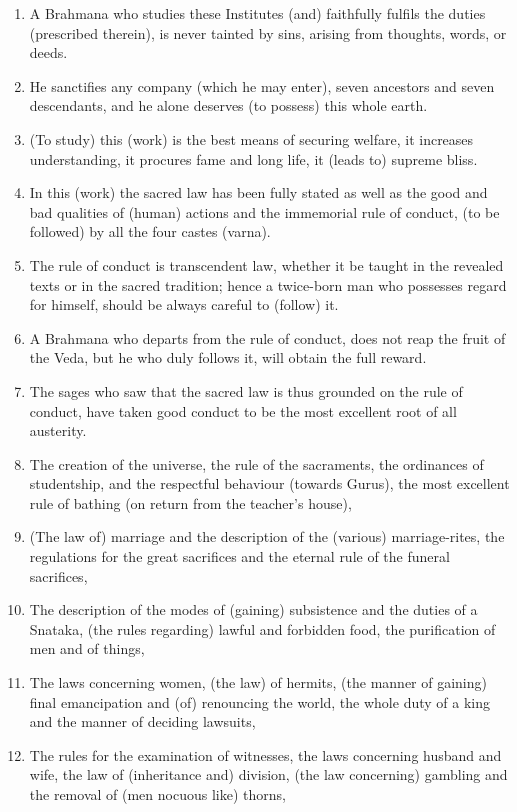 \begin{enumerate}
\item A Brahmana who studies these Institutes (and) faithfully fulfils the duties (prescribed therein), is never tainted by sins, arising from thoughts, words, or deeds.
\item He sanctifies any company (which he may enter), seven ancestors and seven descendants, and he alone deserves (to possess) this whole earth.
\item (To study) this (work) is the best means of securing welfare, it increases understanding, it procures fame and long life, it (leads to) supreme bliss.
\item In this (work) the sacred law has been fully stated as well as the good and bad qualities of (human) actions and the immemorial rule of conduct, (to be followed) by all the four castes (varna).
\item The rule of conduct is transcendent law, whether it be taught in the revealed texts or in the sacred tradition; hence a twice-born man who possesses regard for himself, should be always careful to (follow) it.
\item A Brahmana who departs from the rule of conduct, does not reap the fruit of the Veda, but he who duly follows it, will obtain the full reward.
\item The sages who saw that the sacred law is thus grounded on the rule of conduct, have taken good conduct to be the most excellent root of all austerity.
\item The creation of the universe, the rule of the sacraments, the ordinances of studentship, and the respectful behaviour (towards Gurus), the most excellent rule of bathing (on return from the teacher's house),
\item (The law of) marriage and the description of the (various) marriage-rites, the regulations for the great sacrifices and the eternal rule of the funeral sacrifices,
\item The description of the modes of (gaining) subsistence and the duties of a Snataka, (the rules regarding) lawful and forbidden food, the purification of men and of things,
\item The laws concerning women, (the law) of hermits, (the manner of gaining) final emancipation and (of) renouncing the world, the whole duty of a king and the manner of deciding lawsuits,
\item The rules for the examination of witnesses, the laws concerning husband and wife, the law of (inheritance and) division, (the law concerning) gambling and the removal of (men nocuous like) thorns,

\end{enumerate}
